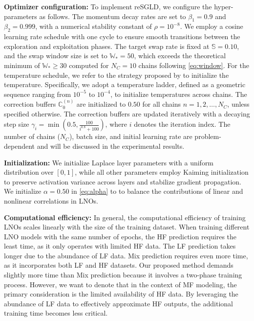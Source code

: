 \textbf{Optimizer configuration:} To implement reSGLD, we configure the hyper-parameters as follows. The momentum decay rates are set to $\beta_1 = 0.9$ and $\beta_2 = 0.999$, with a numerical stability constant of $\rho = 10^{-8}$. We employ a cosine learning rate schedule with one cycle to ensure smooth transitions between the exploration and exploitation phases. The target swap rate is fixed at $\mathbb{S} = 0.10$, and the swap window size is set to $\mathbb{W}_* = 50$, which exceeds the theoretical minimum of $\mathbb{W}_* \geq 30$ computed for $N_C = 10$ chains following \eqref{eq:window}. For the temperature schedule, we refer to the strategy proposed by \citep{kim2022stochastic} to initialize the temperature. Specifically, we adopt a temperature ladder, defined as a geometric sequence ranging from $10^{-5}$ to $10^{-4}$, to initialize temperatures across chains. The correction buffers $\mathbb{C}_0^{(n)}$ are initialized to $0.50$ for all chains $n = 1, 2, \dots, N_C$, unless specified otherwise. The correction buffers are updated iteratively with a decaying step size $\gamma_i = \min\left(0.5, \frac{100}{i^{0.8} + 100}\right)$, where $i$ denotes the iteration index. The number of chains ($N_C$), batch size, and initial learning rate are problem-dependent and will be discussed in the experimental results.

\textbf{Initialization:} We initialize Laplace layer parameters with a uniform distribution over $[0,1]$, while all other parameters employ Kaiming initialization \citep{he2015delving} to preserve activation variance across layers and stabilize gradient propagation. We initialize $\alpha=0.50$ in \eqref{eq:alpha} to to balance the contributions of linear and nonlinear correlations in LNOs.

\textbf{Computational efficiency:} In general, the computational efficiency of training LNOs scales linearly with the size of the training dataset. When training different LNO models with the same number of epochs, the HF prediction requires the least time, as it only operates with limited HF data. The LF prediction takes longer due to the abundance of LF data. Mix prediction requires even more time, as it incorporates both LF and HF datasets. Our proposed method demands slightly more time than Mix prediction because it involves a two-phase training process. However, we want to denote that in the context of MF modeling, the primary consideration is the limited availability of HF data. By leveraging the abundance of LF data to effectively approximate HF outputs, the additional training time becomes less critical. 

